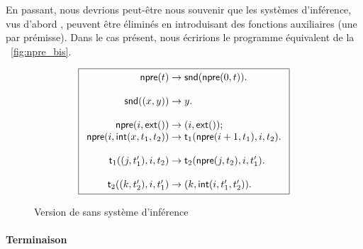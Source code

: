 En passant, nous devrions peut-être nous souvenir que les systèmes
d'inférence, vus d'abord
, peuvent être éliminés en introduisant des
fonctions auxiliaires (une par prémisse). Dans le cas présent, nous
écririons le programme équivalent de la
\fig~\vref{fig:npre_bis}.
\begin{figure}
\begin{equation*}
\boxed{
\begin{array}{r@{\;}c@{\;}l}
\fun{npre}(t) & \rightarrow & \fun{snd}(\fun{npre}(0,t)).\\
\\
\fun{snd}(\pair{x}{y}) & \rightarrow & y.\\
\\
\fun{npre}(i,\fun{ext}()) & \rightarrow & \pair{i}{\fun{ext}()};\\
\fun{npre}(i,\fun{int}(x,t_1,t_2)) & \rightarrow &
\fun{t}_1(\fun{npre}(i+1,t_1),i,t_2).\\
\\
\fun{t}_1(\pair{j}{t'_1},i,t_2) & \rightarrow &
\fun{t}_2(\fun{npre}(j,t_2),i,t'_1).\\
\\
\fun{t}_2(\pair{k}{t'_2},i,t'_1) & \rightarrow & \pair{k}{\fun{int}(i,t'_1,t'_2)}.
\end{array}
}
\end{equation*}
\caption{Version de  sans système d'inférence\label{fig:npre_bis}}
\end{figure}

\paragraph{Terminaison}

